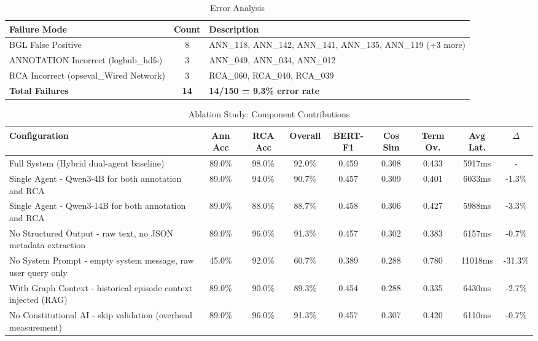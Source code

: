 \begin{table}[h]
\centering
\caption{Error Analysis}
\label{tab:error-analysis}
\begin{tabular}{lcp{8cm}}
\toprule
\textbf{Failure Mode} & \textbf{Count} & \textbf{Description} \\
\midrule
BGL False Positive & 8 & ANN_118, ANN_142, ANN_141, ANN_135, ANN_119 (+3 more) \\
ANNOTATION Incorrect (loghub_hdfs) & 3 & ANN_049, ANN_034, ANN_012 \\
RCA Incorrect (opseval_Wired Network) & 3 & RCA_060, RCA_040, RCA_039 \\
\midrule
\textbf{Total Failures} & \textbf{14} & \textbf{14/150 = 9.3\% error rate} \\
\bottomrule
\end{tabular}
\end{table}


\begin{table}[h]
\centering
\caption{Ablation Study: Component Contributions}
\label{tab:ablation}
\begin{tabular}{lcccccccc}
\toprule
\textbf{Configuration} & \textbf{Ann Acc} & \textbf{RCA Acc} & \textbf{Overall} & \textbf{BERT-F1} & \textbf{Cos Sim} & \textbf{Term Ov.} & \textbf{Avg Lat.} & \textbf{$\Delta$} \\
\midrule
Full System (Hybrid dual-agent baseline) & 89.0\% & 98.0\% & 92.0\% & 0.459 & 0.308 & 0.433 & 5917ms & - \\
Single Agent - Qwen3-4B for both annotation and RCA & 89.0\% & 94.0\% & 90.7\% & 0.457 & 0.309 & 0.401 & 6033ms & -1.3\% \\
Single Agent - Qwen3-14B for both annotation and RCA & 89.0\% & 88.0\% & 88.7\% & 0.458 & 0.306 & 0.427 & 5988ms & -3.3\% \\
No Structured Output - raw text, no JSON metadata extraction & 89.0\% & 96.0\% & 91.3\% & 0.457 & 0.302 & 0.383 & 6157ms & -0.7\% \\
No System Prompt - empty system message, raw user query only & 45.0\% & 92.0\% & 60.7\% & 0.389 & 0.288 & 0.780 & 11018ms & -31.3\% \\
With Graph Context - historical episode context injected (RAG) & 89.0\% & 90.0\% & 89.3\% & 0.454 & 0.288 & 0.335 & 6430ms & -2.7\% \\
No Constitutional AI - skip validation (overhead measurement) & 89.0\% & 96.0\% & 91.3\% & 0.457 & 0.307 & 0.420 & 6110ms & -0.7\% \\
\bottomrule
\end{tabular}
\end{table}

